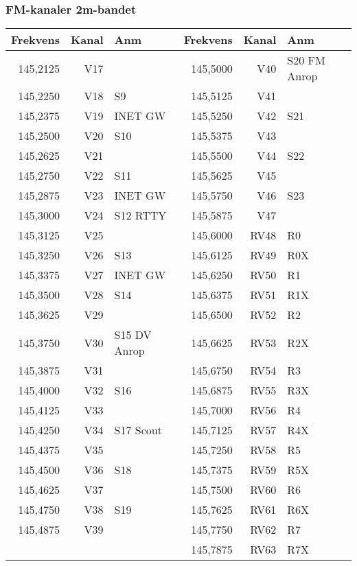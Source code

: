 \clearpage
\subsubsection{FM-kanaler 2m-bandet}

\begin{longtable}{rrl|rrl}

\textbf{Frekvens} & \textbf{Kanal} & \textbf{Anm} & 
\textbf{Frekvens} & \textbf{Kanal} & \textbf{Anm} \\ \hline

145,2125 & V17 &              & 145,5000 & V40  & S20  FM Anrop \\
145,2250 & V18 & S9           & 145,5125 & V41  &               \\
145,2375 & V19 & INET GW      & 145,5250 & V42  & S21           \\
145,2500 & V20 & S10          & 145,5375 & V43  &               \\
145,2625 & V21 &              & 145,5500 & V44  & S22           \\
145,2750 & V22 & S11          & 145,5625 & V45  &               \\
145,2875 & V23 & INET GW      & 145,5750 & V46  & S23           \\
145,3000 & V24 & S12  RTTY    & 145,5875 & V47  &               \\
145,3125 & V25 &              & 145,6000 & RV48 & R0            \\
145,3250 & V26 & S13          & 145,6125 & RV49 & R0X           \\
145,3375 & V27 & INET GW      & 145,6250 & RV50 & R1            \\
145,3500 & V28 & S14          & 145,6375 & RV51 & R1X           \\
145,3625 & V29 &              & 145,6500 & RV52 & R2            \\
145,3750 & V30 & S15 DV Anrop & 145,6625 & RV53 & R2X           \\
145,3875 & V31 &              & 145,6750 & RV54 & R3            \\
145,4000 & V32 & S16          & 145,6875 & RV55 & R3X           \\
145,4125 & V33 &              & 145,7000 & RV56 & R4            \\
145,4250 & V34 & S17 Scout    & 145,7125 & RV57 & R4X           \\
145,4375 & V35 &              & 145,7250 & RV58 & R5            \\
145,4500 & V36 & S18          & 145,7375 & RV59 & R5X           \\
145,4625 & V37 &              & 145,7500 & RV60 & R6            \\
145,4750 & V38 & S19          & 145,7625 & RV61 & R6X           \\
145,4875 & V39 &              & 145,7750 & RV62 & R7            \\
         &     &              & 145,7875 & RV63 & R7X
\end{longtable}


